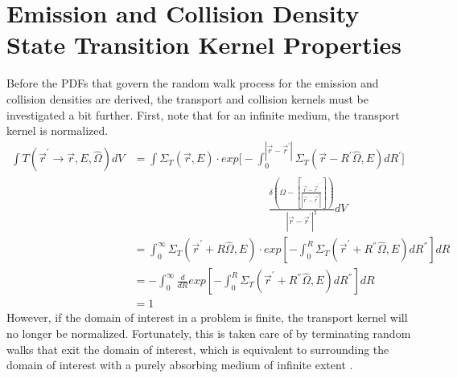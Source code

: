 \section{Emission and Collision Density State Transition Kernel Properties}
Before the PDFs that govern the random walk process for the emission and
collision densities are derived, the transport and collision kernels must be 
investigated a bit further. First, note that for an infinite medium, the 
transport kernel is normalized. 
\begin{align}
  \int T(\vec{r}^{'} \to \vec{r},E,\hat{\Omega})dV & =
    \int \Sigma_T(\vec{r},E)
    \cdot exp\Big[-\int_0^{|\vec{r} - \vec{r}^{'}|} 
      \Sigma_T(\vec{r}-R^{'}\hat{\Omega},E)dR^{'} \Big] \nonumber \\
    & \qquad \qquad \qquad \qquad \qquad \qquad
    \frac{\delta \left(\Omega - \left[\frac{\vec{r} - \vec{r}^{'}}
        {|\vec{r} - \vec{r}^{'}|}\right]\right)}
    {|\vec{r} - \vec{r}^{'}|^2} dV \nonumber \\
  & = \int_0^{\infty} \Sigma_T(\vec{r}^{'}+R\hat{\Omega},E)
  \cdot exp\left[-\int_0^R \Sigma_T(\vec{r}^{'}+R^{''}\hat{\Omega},E)
    dR^{''} \right] dR \nonumber \\
  & = -\int_0^{\infty} \frac{d}{dR} exp\left[-\int_0^R 
    \Sigma_T(\vec{r}^{'}+R^{''}\hat{\Omega},E) dR^{''} \right] dR 
  \nonumber \\
  & = 1 \nonumber
\end{align}
However, if the domain of interest in a problem is finite, the transport kernel 
will no longer be normalized. Fortunately, this is taken care of by terminating 
random walks that exit the domain of interest, which is equivalent to 
surrounding the domain of interest with a purely absorbing medium of infinite 
extent \citep{irving_adjoint_1971}.

